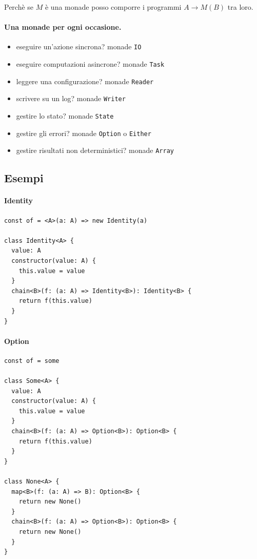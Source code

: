 \documentclass[12pt]{article}
\begin{document}
Perchè se $M$ è una monade posso comporre i programmi $A \rightarrow M(B)$ tra loro.

\paragraph{Una monade per ogni occasione.}

\begin{itemize}
  \item eseguire un'azione sincrona? monade \texttt{IO}
  \item eseguire computazioni asincrone? monade \texttt{Task}
  \item leggere una configurazione? monade \texttt{Reader}
  \item scrivere su un log? monade \texttt{Writer}
  \item gestire lo stato? monade \texttt{State}
  \item gestire gli errori? monade \texttt{Option} o \texttt{Either}
  \item gestire risultati non deterministici? monade \texttt{Array}
\end{itemize}

\subsection{Esempi}

\paragraph{Identity}

\begin{verbatim}
const of = <A>(a: A) => new Identity(a)

class Identity<A> {
  value: A
  constructor(value: A) {
    this.value = value
  }
  chain<B>(f: (a: A) => Identity<B>): Identity<B> {
    return f(this.value)
  }
}
\end{verbatim}

\paragraph{Option}

\begin{verbatim}
const of = some

class Some<A> {
  value: A
  constructor(value: A) {
    this.value = value
  }
  chain<B>(f: (a: A) => Option<B>): Option<B> {
    return f(this.value)
  }
}

class None<A> {
  map<B>(f: (a: A) => B): Option<B> {
    return new None()
  }
  chain<B>(f: (a: A) => Option<B>): Option<B> {
    return new None()
  }
}
\end{verbatim}
\end{document}
